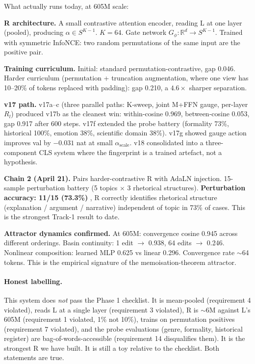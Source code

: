 \documentclass[10pt, twocolumn, a4paper]{article}
\newcommand{\R}{\mathbb{R}}
\begin{document}
What actually runs today, at 605M scale:

\textbf{R architecture.} A small contrastive attention encoder, reading L at one layer (pooled), producing $\alpha \in S^{K-1}$. $K=64$. Gate network $G_\phi: \R^d \to S^{K-1}$. Trained with symmetric InfoNCE: two random permutations of the same input are the positive pair.

\textbf{Training curriculum.} Initial: standard permutation-contrastive, gap 0.046. Harder curriculum (permutation + truncation augmentation, where one view has 10--20\% of tokens replaced with padding): gap 0.210, a $4.6\times$ sharper separation.

\textbf{v17 path.} v17a--c (three parallel paths: K-sweep, joint M+FFN gauge, per-layer $R_l$) produced v17b as the cleanest win: within-cosine 0.969, between-cosine 0.053, gap 0.917 after 600 steps. v17f extended the probe battery (formality 73\%, historical 100\%, emotion 38\%, scientific domain 38\%). v17g showed gauge action improves val by $-0.031$ nat at small $\alpha_{\text{scale}}$. v18 consolidated into a three-component CLS system where the fingerprint is a trained artefact, not a hypothesis.

\textbf{Chain 2 (April 21).} Pairs harder-contrastive R with AdaLN injection. 15-sample perturbation battery (5 topics $\times$ 3 rhetorical structures). \textbf{Perturbation accuracy: 11/15 (73.3\%)} ,  R correctly identifies rhetorical structure (explanation / argument / narrative) independent of topic in 73\% of cases. This is the strongest Track-1 result to date.

\textbf{Attractor dynamics confirmed.} At 605M: convergence cosine 0.945 across different orderings. Basin continuity: 1 edit $\to$ 0.938, 64 edits $\to$ 0.246. Nonlinear composition: learned MLP 0.625 vs linear 0.296. Convergence rate $\sim$64 tokens. This is the empirical signature of the memoisation-theorem attractor.

\paragraph{Honest labelling.} This system does \emph{not} pass the Phase 1 checklist. It is mean-pooled (requirement 4 violated), reads L at a single layer (requirement 3 violated), R is $\sim$6M against L's 605M (requirement 1 violated, 1\% not 10\%), trains on permutation positives (requirement 7 violated), and the probe evaluations (genre, formality, historical register) are bag-of-words-accessible (requirement 14 disqualifies them). It is the strongest R we have built. It is still a toy relative to the checklist. Both statements are true.
\end{document}

